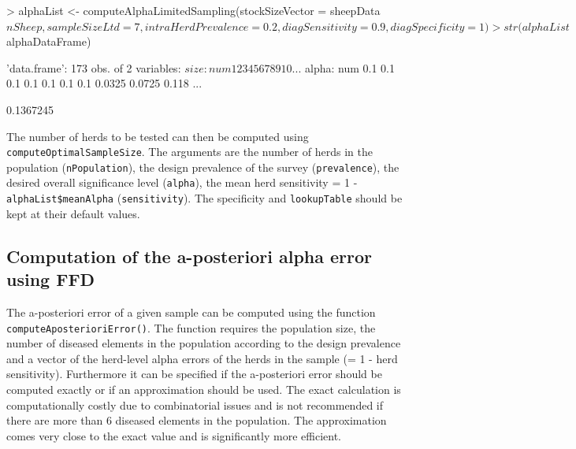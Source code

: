\documentclass[nojss]{jss}
\begin{document}
\begin{Schunk}
\begin{Sinput}
> alphaList <- computeAlphaLimitedSampling(stockSizeVector = sheepData$nSheep,
       sampleSizeLtd = 7, intraHerdPrevalence = 0.2, diagSensitivity = 0.9,
       diagSpecificity = 1)
> str(alphaList$alphaDataFrame)
\end{Sinput}
\begin{Soutput}
'data.frame':	173 obs. of  2 variables:
 $ size : num  1 2 3 4 5 6 7 8 9 10 ...
 $ alpha: num  0.1 0.1 0.1 0.1 0.1 0.1 0.1 0.0325 0.0725 0.118 ...
\end{Soutput}
\begin{Soutput}
[1] 0.1367245
\end{Soutput}
\end{Schunk}

The number of herds to be tested can then be computed using \texttt{computeOptimalSampleSize}. The arguments are the number of herds in the population (\texttt{nPopulation}), the design prevalence of the survey (\texttt{prevalence}), the desired overall significance level (\texttt{alpha}), the mean herd sensitivity = 1 - \texttt{alphaList\$meanAlpha} (\texttt{sensitivity}). The specificity and \texttt{lookupTable} should be kept at their default values.


\subsection{Computation of the a-posteriori alpha error using FFD}

The a-posteriori error  of a given sample can be computed using the function  \texttt{computeAposterioriError()}. The function requires the population size, the number of diseased elements in the population according to the design prevalence and a vector of the herd-level alpha errors of the herds in the sample (= 1 - herd sensitivity). Furthermore it can be specified if the a-posteriori error should be computed exactly or if an approximation should be used. The exact calculation is computationally costly due to combinatorial issues and is not recommended if there are more than 6 diseased elements in the population. The approximation comes very close to the exact value and is significantly more efficient.
\end{document}
